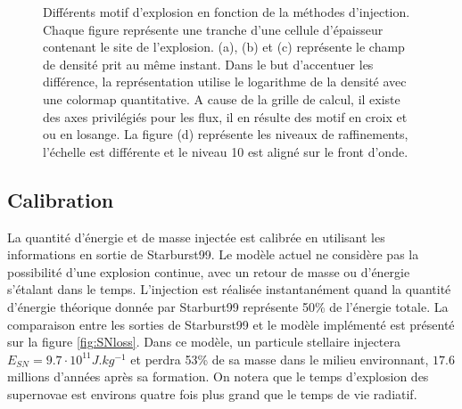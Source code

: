 \begin{figure}

    \caption[Test de Sedov - Tranches]{Différents motif d'explosion en fonction de la méthodes d'injection.
    Chaque figure représente une tranche d'une cellule d'épaisseur contenant le site de l'explosion.
    (a), (b) et (c) représente le champ de densité prit au même instant.
    Dans le but d'accentuer les différence, la représentation utilise le logarithme de la densité avec une colormap quantitative.
    A cause de la grille de calcul, il existe des axes privilégiés pour les flux, il en résulte des motif en croix et ou en losange.
    La figure (d) représente les niveaux de raffinements, l'échelle est différente et le niveau 10 est aligné sur le front d'onde.
    }
 	\label{fig:sedovslice}
\end{figure}

\subsection{Calibration}
\label{sec:sncali}
La quantité d'énergie et de masse injectée est calibrée en utilisant les informations en sortie de Starburst99.
Le modèle actuel ne considère pas la possibilité d'une explosion continue, avec un retour de masse ou d'énergie s'étalant dans le temps.
L'injection est réalisée instantanément quand la quantité d’énergie théorique donnée par Starburt99 représente 50\% de l’énergie totale.
La comparaison entre les sorties de Starburst99 et le modèle implémenté est présenté sur la figure \ref{fig:SNloss}.
Dans ce modèle, un particule stellaire injectera $E_{SN} = 9.7\cdot 10^{11} J.kg^{-1}$ et perdra 53\% de sa masse dans le milieu environnant, $17.6$ millions d'années après sa formation.
On notera que le temps d'explosion des supernovae est environs quatre fois plus grand que le temps de vie radiatif.

